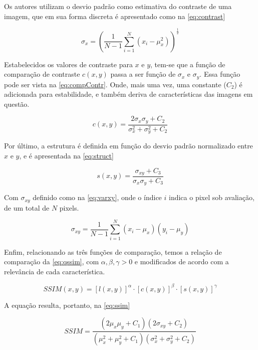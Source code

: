 Os autores utilizam o desvio padrão como estimativa do contraste de uma imagem, que em sua forma discreta é apresentado como na \autoref*{eq:contrast}

\begin{equation}\label{eq:contrast}
	\sigma_x = \left(\frac{1}{N-1}\sum^{N}_{i=1}(x_i - \mu_x^2) \right)^\frac{1}{2}
\end{equation}

Estabelecidos os valores de contraste para $x$ e $y$, tem-se que a função de comparação de contraste $c(x,y)$ passa a ser função de $\sigma_x$ e $\sigma_y$. Essa função pode ser vista na \autoref*{eq:compContr}. Onde, mais uma vez, uma constante ($C_2$) é adicionada para estabilidade, e também deriva de características das imagens em questão.

\begin{equation}\label{eq:compContr}
	c(x,y) = \frac{2\sigma_x\sigma_y + C_2}{\sigma^{2}_x + \sigma^2_y + C_2}
\end{equation}


Por último, a estrutura é definida em função do desvio padrão normalizado entre $x$ e $y$, e é apresentada na \autoref*{eq:struct}

\begin{equation}\label{eq:struct}
	s(x,y) = \frac{\sigma_{xy} + C_3}{\sigma_x \sigma_y + C_3}
\end{equation}

Com $\sigma_{xy}$ definido como na \autoref*{eq:varxy}, onde o índice $i$ indica o pixel sob avaliação, de um total de $N$ pixels.

\begin{equation}\label{eq:varxy}
	\sigma_{xy} = \frac{1}{N-1}\sum^{N}_{i=1}(x_i - \mu_x)(y_i - \mu_y)
\end{equation}

Enfim, relacionando as três funções de comparação, temos a relação de comparação da \autoref*{eq:qssim}, com $\alpha, \beta, \gamma > 0$ e modificados de acordo com a relevância de cada característica.

\begin{equation}\label{eq:qssim}
	SSIM(x,y) = [l(x,y)]^{\alpha} \cdot [c(x,y)]^{\beta} \cdot [s(x,y)]^{\gamma}
\end{equation}

A equação resulta, portanto, na \autoref*{eq:ssim}

\begin{equation}\label{eq:ssim}
	SSIM = \frac{(2\mu_x\mu_y + C_1)(2\sigma_{xy} + C_2)}{(\mu^{2}_{x} + \mu^{2}_{y} + C_1)(\sigma^{2}_{x} + \sigma^{2}_{y} + C_2)}
\end{equation}

